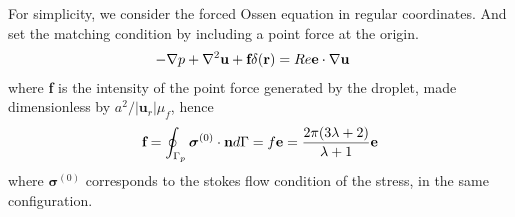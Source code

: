 For simplicity, we consider the forced Ossen equation in regular coordinates. And set the matching condition by including a point force at the origin. 
\begin{align}
    -\grad p + \grad^2 \textbf{u}
    + \textbf{f}\delta(\textbf{r})
    &= 
    Re  \textbf{e} \cdot \grad \textbf{u} 
\end{align}
where \textbf{f} is the intensity of the point force generated by the droplet, made dimensionless by $a^2 / |\textbf{u}_r| \mu_f$, hence 
\begin{equation}
    \textbf{f}= \intS[p]{\bm\sigma^{(0)}\cdot \textbf{n}}=f \textbf{e} = \frac{2\pi(3\lambda+2)}{\lambda+1}\textbf{e}
\end{equation}
where $\bm\sigma^{(0)}$ corresponds to the stokes flow condition of the stress, in the same configuration. 

